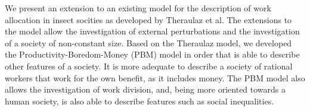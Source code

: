 We present an extension to an existing model for the description of work allocation in insect socities as developed by Theraulaz et al. The extensions to the model allow the investigation of external perturbations and the investigation of a society of non-constant size.
Based on the Theraulaz model, we developed the Productivity-Boredom-Money (PBM) model in order that is able to describe other features of a society. It is more adequate to describe a society of rational workers that work for the own benefit, as it includes money. The PBM model also allows the investigation of work division, and, being more oriented towards a human society, is also able to describe features such as social inequalities.

